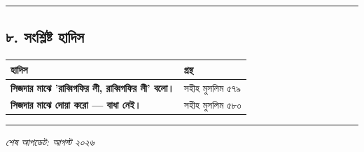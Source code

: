 \medskip\hrule\medskip

\subsection*{৮. সংশ্লিষ্ট হাদিস}

\begin{table}[h]\centering\small
\begin{tabular}{ll}
হাদিস & গ্রন্থ \\
\hline
\textbf{\lat{“}সিজদার মাঝে 'রাব্বিগফির লী, রাব্বিগফির লী' বলো।\lat{”}} & সহীহ মুসলিম ৫৭৯ \\
\textbf{\lat{“}সিজদার মাঝে দোয়া করো — বাধা নেই।\lat{”}} & সহীহ মুসলিম ৫৮০ \\
\hline
\end{tabular}
\end{table}

\medskip\hrule\medskip

\textit{শেষ আপডেট: আগস্ট ২০২৬}


